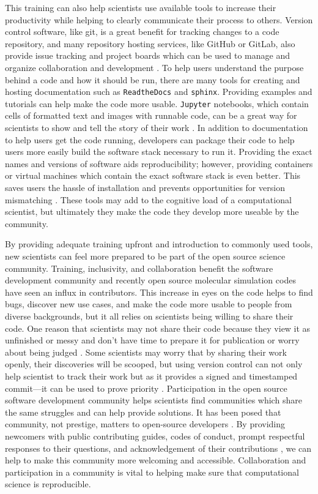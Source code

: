 This training can also help scientists use available tools to increase their productivity while helping to clearly communicate their process to others. 
Version control software, like git, is a great benefit for tracking changes to a code repository, and many repository hosting services, like GitHub or GitLab, also provide issue tracking and project boards which can be used to manage and organize collaboration and development \cite{Gentzkow2014}.
To help users understand the purpose behind a code and how it should be run, there are many tools for creating and hosting documentation such as \texttt{ReadtheDocs} and \texttt{sphinx}.
Providing examples and tutorials can help make the code more usable.
\texttt{Jupyter} notebooks, which contain cells of formatted text and images with runnable code, can be a great way for scientists to show and tell the story of their work \cite{Rule2019a}.
In addition to documentation to help users get the code running, developers can package their code to help users more easily build the software stack necessary to run it.
Providing the exact names and versions of software aids reproducibility; however, providing containers or virtual machines which contain the exact software stack is even better. This saves users the hassle of installation and prevents opportunities for version mismatching \cite{Cito2016, Shirts2008a}.
These tools may add to the cognitive load of a computational scientist, but ultimately they make the code they develop more useable by the community.

By providing adequate training upfront and introduction to commonly used tools, new scientists can feel more prepared to be part of the open source science community.
Training, inclusivity, and collaboration benefit the software development community and recently open source molecular simulation codes have seen an influx in contributors\cite{Jankowski2019}.
This increase in eyes on the code helps to find bugs, discover new use cases, and make the code more usable to people from diverse backgrounds, but it all relies on scientists being willing to share their code.
One reason that scientists may not share their code because they view it as unfinished or messy and don't have time to prepare it for publication or worry about being judged \cite{Irving2016}.
Some scientists may worry that by sharing their work openly, their discoveries will be scooped, but using version control can not only help scientist to track their work but as it provides a signed and timestamped commit---it can be used to prove priority \cite{Blischak2016}. 
Participation in the open source software development community helps scientists find communities which share the same struggles and can help provide solutions.
It has been posed that community, not prestige, matters to open-source developers \cite{Smirnova2022}.
By providing newcomers with public contributing guides, codes of conduct, prompt respectful responses to their questions, and acknowledgement of their contributions \cite{Sholler2019}, we can help to make this community more welcoming and accessible.
Collaboration and participation in a community is vital to helping make sure that computational science is reproducible. 

